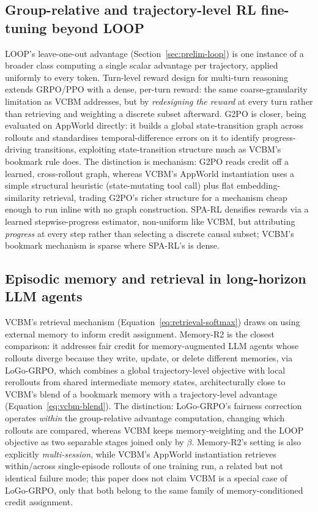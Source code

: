 \documentclass[conference]{IEEEtran}
\begin{document}
\subsection{Group-relative and trajectory-level RL fine-tuning beyond LOOP}
\label{sec:rw-trajectory}

LOOP's leave-one-out advantage (Section~\ref{sec:prelim-loop}) is one instance of a broader class computing a single scalar advantage per trajectory, applied uniformly to every token. Turn-level reward design for multi-turn reasoning \cite{b_multi_turn_grpo2025} extends GRPO/PPO with a dense, per-turn reward: the same coarse-granularity limitation as VCBM addresses, but by \emph{redesigning the reward} at every turn rather than retrieving and weighting a discrete subset afterward. G2PO \cite{b_g2po2026} is closer, being evaluated on AppWorld directly: it builds a global state-transition graph across rollouts and standardises temporal-difference errors on it to identify progress-driving transitions, exploiting state-transition structure much as VCBM's bookmark rule does. The distinction is mechanism: G2PO reads credit off a learned, cross-rollout graph, whereas VCBM's AppWorld instantiation uses a simple structural heuristic (state-mutating tool call) plus flat embedding-similarity retrieval, trading G2PO's richer structure for a mechanism cheap enough to run inline with no graph construction. SPA-RL \cite{b_spa_rl2025} densifies rewards via a learned stepwise-progress estimator, non-uniform like VCBM, but attributing \emph{progress} at every step rather than selecting a discrete causal subset; VCBM's bookmark mechanism is sparse where SPA-RL's is dense.

\subsection{Episodic memory and retrieval in long-horizon LLM agents}
\label{sec:rw-memory}

VCBM's retrieval mechanism (Equation~\eqref{eq:retrieval-softmax}) draws on using external memory to inform credit assignment. Memory-R2 \cite{b_memoryr22026} is the closest comparison: it addresses fair credit for memory-augmented LLM agents whose rollouts diverge because they write, update, or delete different memories, via LoGo-GRPO, which combines a global trajectory-level objective with local rerollouts from shared intermediate memory states, architecturally close to VCBM's blend of a bookmark memory with a trajectory-level advantage (Equation~\eqref{eq:vcbm-blend}). The distinction: LoGo-GRPO's fairness correction operates \emph{within} the group-relative advantage computation, changing which rollouts are compared, whereas VCBM keeps memory-weighting and the LOOP objective as two separable stages joined only by $\beta$. Memory-R2's setting is also explicitly \emph{multi-session}, while VCBM's AppWorld instantiation retrieves within/across single-episode rollouts of one training run, a related but not identical failure mode; this paper does not claim VCBM is a special case of LoGo-GRPO, only that both belong to the same family of memory-conditioned credit assignment.
\end{document}
